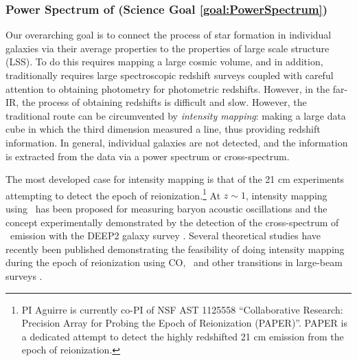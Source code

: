 \subsubsection{Power Spectrum of \cii (Science Goal \ref{goal:PowerSpectrum})}

Our overarching goal is to connect the process of star formation in
individual galaxies via their average properties to the properties of
large scale structure (LSS).  To do this requires mapping a large
cosmic volume, and in addition, traditionally requires large
spectroscopic redshift surveys coupled with careful attention to
obtaining photometry for photometric redshifts.  However, in the
far-IR, the process of obtaining redshifts is difficult and slow.
However, the traditional route can be circumvented by {\it intensity
mapping}: making a large data cube in which the third dimension
measured a line, thus providing redshift information.
In general, individual galaxies
are not detected, and the information is extracted from the data via a
power spectrum or cross-spectrum.

The most developed case for intensity mapping is that of the 21 cm
experiments attempting to detect the epoch of reionization.\footnote{PI
Aguirre is currently co-PI of NSF AST 1125558 ``Collaborative
Research: Precision Array for Probing the Epoch of Reionization
(PAPER)''.  PAPER is a dedicated attempt to detect the highly
redshifted 21 cm emission from the epoch of reionization.}  At $z \sim
1$, intensity mapping using \hi\ has been proposed for measuring
baryon acoustic oscillations \citep[BAO][]{chang08} and the concept
experimentally demonstrated by the detection of the cross-spectrum of
\hi\ emission with the DEEP2 galaxy survey \citep{chang10}.  Several
theoretical studies have recently been published demonstrating the
feasibility of doing intensity mapping during the epoch of
reionization using CO, \cii\ and other transitions in large-beam
surveys
\citep{carilli11,lidz11,gong11co,gong11cii,visbal11,visbal10}.

